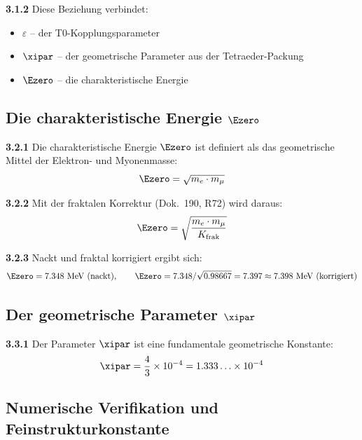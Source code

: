 	\noindent \textbf{3.1.2} Diese Beziehung verbindet:
	\begin{itemize}
		\item $\varepsilon$ -- der T0-Kopplungsparameter
		\item $\xipar$ -- der geometrische Parameter aus der Tetraeder-Packung
		\item $\Ezero$ -- die charakteristische Energie
	\end{itemize}
	
	\subsection{Die charakteristische Energie $\Ezero$}
	
	\noindent \textbf{3.2.1} Die charakteristische Energie $\Ezero$ ist definiert als das geometrische Mittel der Elektron- und Myonenmasse:
	\begin{equation}
		\Ezero = \sqrt{m_e \cdot m_\mu}
		\label{eq:E0_geometric_mean}
	\end{equation}
	
	\noindent \textbf{3.2.2} Mit der fraktalen Korrektur (Dok.~190, R72) wird daraus:
	\begin{equation}
		\Ezero = \sqrt{\frac{m_e \cdot m_\mu}{K_{\text{frak}}}}
	\end{equation}
	
	\noindent \textbf{3.2.3} Nackt und fraktal korrigiert ergibt sich:
	\begin{equation}
		\Ezero = 7.348 \text{ MeV (nackt)}, \qquad \Ezero = 7.348/\sqrt{0.98667} = 7.397 \approx 7.398 \text{ MeV (korrigiert)}
	\end{equation}
	
	\subsection{Der geometrische Parameter $\xipar$}
	
	\noindent \textbf{3.3.1} Der Parameter $\xipar$ ist eine fundamentale geometrische Konstante:
	\begin{equation}
		\xipar = \frac{4}{3} \times 10^{-4} = 1.333\ldots \times 10^{-4}
		\label{eq:xi_value}
	\end{equation}
	
	\subsection{Numerische Verifikation und Feinstrukturkonstante}
	
